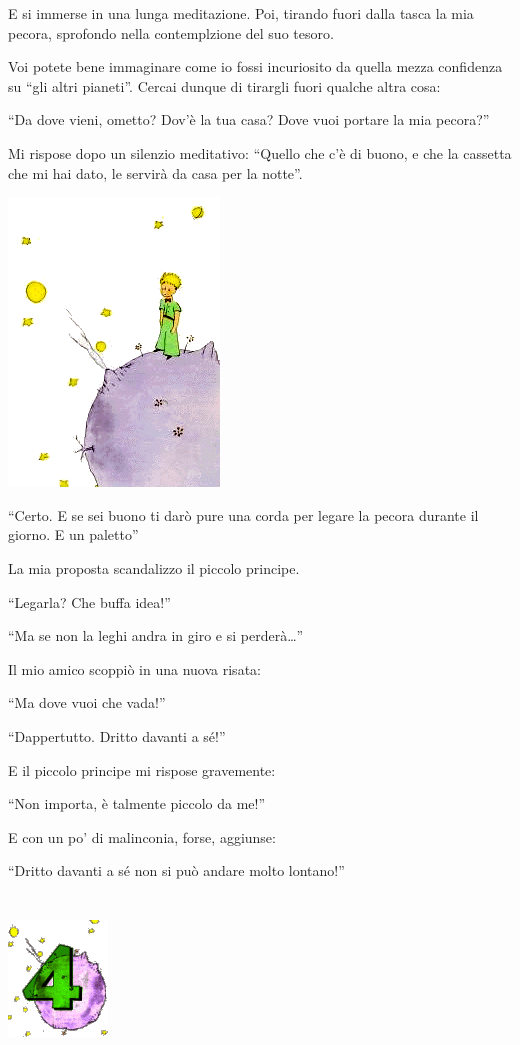 \documentclass[11pt]{scrbook}
\begin{document}
E si immerse in una lunga meditazione. Poi, tirando fuori dalla tasca la mia pecora, sprofondo nella contemplzione del suo tesoro.

Voi potete bene immaginare come io fossi incuriosito da quella mezza confidenza su ``gli altri pianeti''. Cercai dunque di tirargli fuori qualche altra cosa:

``Da dove vieni, ometto? Dov'è la tua casa? Dove vuoi portare la mia pecora?''

Mi rispose dopo un silenzio meditativo: ``Quello che c'è di buono, e che la cassetta che mi hai dato, le servirà da casa per la notte''.

\begin{center}
\includegraphics{img/estrellas}
\end{center}

``Certo. E se sei buono ti darò pure una corda per legare la pecora durante il giorno. E un paletto''

La mia proposta scandalizzo il piccolo principe.

``Legarla? Che buffa idea!''

``Ma se non la leghi andra in giro e si perderà\ldots{}''

Il mio amico scoppiò in una nuova risata:

``Ma dove vuoi che vada!''

``Dappertutto. Dritto davanti a sé!''

E il piccolo principe mi rispose gravemente:

``Non importa, è talmente piccolo da me!''

E con un po' di malinconia, forse, aggiunse:

``Dritto davanti a sé non si può andare molto lontano!''

\chapter{}
\begin{center}
\includegraphics{img/chapter4}
\end{center}
\end{document}
